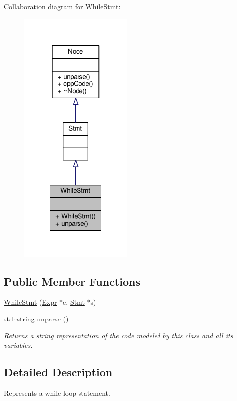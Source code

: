 Collaboration diagram for While\-Stmt\-:\nopagebreak
\begin{figure}[H]
\begin{center}
\leavevmode
\includegraphics[width=156pt]{classWhileStmt__coll__graph}
\end{center}
\end{figure}
\subsection*{Public Member Functions}
\begin{DoxyCompactItemize}
\item 
\hyperlink{classWhileStmt_a6583cdbdcb6c53a5d0dd0b0c6507ed18}{While\-Stmt} (\hyperlink{classExpr}{Expr} $\ast$e, \hyperlink{classStmt}{Stmt} $\ast$s)
\item 
std\-::string \hyperlink{classWhileStmt_a1fd1b12f4d16d898b9dcc647417057fa}{unparse} ()
\begin{DoxyCompactList}\small\item\em Returns a string representation of the code modeled by this class and all its variables. \end{DoxyCompactList}\end{DoxyCompactItemize}


\subsection{Detailed Description}
Represents a while-\/loop statement. \par
 

